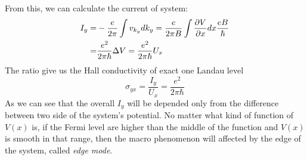 \documentclass[unnumsec,webpdf,modern,large]{mam-authoring-template}%
\theoremstyle{thmstyleone}%
\theoremstyle{thmstyletwo}%
\theoremstyle{thmstylethree}%
\begin{document}
\quad From this, we can calculate the current of system:
\begin{align}
	I_y =&-\frac{e}{2\pi}\int v_{k_y}dk_y = \frac{e}{2\pi B}\int \pdv{V}{x} dx \frac{eB}{\hbar}\nonumber
	\\=& \frac{e^2}{2\pi \hbar} \Delta V
	= \frac{e^2}{2\pi \hbar} U_{x}
\end{align}
\quad The ratio give us the Hall conductivity of exact one Landau level
\begin{equation}
	\sigma_{yx} = \frac{I_y}{U_x} = \frac{e^2}{2\pi \hbar}
\end{equation}
As we can see that the overall \(I_y\) will be depended only from the difference between two side of the system's potential. No matter what kind of function of \(V(x)\) is, if the Fermi level are higher than the middle of the function and \(V(x)\) is smooth in that range, then the macro phenomenon will affected by the edge of the system, called \textit{edge mode}.
\end{document}
